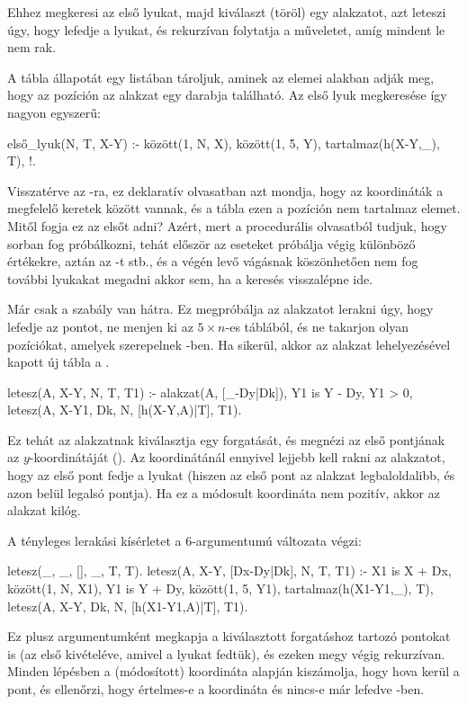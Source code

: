 Ehhez megkeresi az első lyukat, majd kiválaszt
(töröl) egy alakzatot, azt leteszi úgy, hogy lefedje
a lyukat, és rekurzívan folytatja a műveletet, amíg
mindent le nem rak.

A tábla állapotát egy listában tároljuk, aminek az
elemei  alakban adják meg, hogy az
 pozíción az  alakzat egy darabja
található. Az első lyuk megkeresése így nagyon
egyszerű:
\begin{program}
első_lyuk(N, T, X-Y) :-
    között(1, N, X), között(1, 5, Y),
    \+ tartalmaz(h(X-Y,_), T), !.
\end{program}

Visszatérve az -ra, ez deklaratív
olvasatban azt mondja, hogy az  koordináták
a megfelelő keretek között vannak, és a tábla ezen a
pozíción nem tartalmaz elemet. Mitől fogja ez az
elsőt adni? Azért, mert a procedurális olvasatból
tudjuk, hogy sorban fog próbálkozni, tehát először
az  eseteket próbálja végig különböző
 értékekre, aztán az -t stb., és a
végén levő vágásnak köszönhetően nem fog további
lyukakat megadni akkor sem, ha a keresés visszalépne
ide.

Már csak a  szabály van
hátra. Ez megpróbálja az  alakzatot lerakni
úgy, hogy lefedje az  pontot, ne menjen ki
az $5\times n$-es táblából, és ne takarjon olyan
pozíciókat, amelyek szerepelnek -ben. Ha
sikerül, akkor az alakzat lehelyezésével kapott új
tábla a .
\begin{program}
letesz(A, X-Y, N, T, T1) :-
    alakzat(A, [_-Dy|Dk]),
    Y1 is Y - Dy, Y1 > 0,
    letesz(A, X-Y1, Dk, N, [h(X-Y,A)|T], T1).
\end{program}
Ez tehát az  alakzatnak kiválasztja egy
forgatását, és megnézi az első pontjának az
$y$-koordinátáját (). Az  koordinátánál
ennyivel lejjebb kell rakni az alakzatot, hogy az
első pont fedje a lyukat (hiszen az első pont az
alakzat legbaloldalibb, és azon belül legalsó
pontja). Ha ez a módosult  koordináta nem
pozitív, akkor az alakzat kilóg.

A tényleges lerakási kísérletet a 
6-argumentumú változata végzi:
\begin{program}
letesz(_, _, [], _, T, T).
letesz(A, X-Y, [Dx-Dy|Dk], N, T, T1) :-
    X1 is X + Dx, között(1, N, X1),
    Y1 is Y + Dy, között(1, 5, Y1),
    \+ tartalmaz(h(X1-Y1,_), T),
    letesz(A, X-Y, Dk, N, [h(X1-Y1,A)|T], T1).
\end{program}
Ez plusz argumentumként megkapja a kiválasztott
forgatáshoz tartozó pontokat is (az első kivételéve,
amivel a lyukat fedtük), és ezeken megy végig
rekurzívan. Minden lépésben a (módosított) 
koordináta alapján kiszámolja, hogy hova kerül a
pont, és ellenőrzi, hogy értelmes-e a koordináta és
nincs-e már lefedve -ben.

